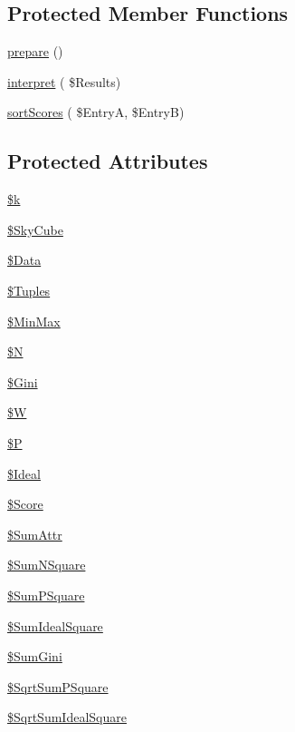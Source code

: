 \subsection*{Protected Member Functions}
\begin{DoxyCompactItemize}
\item 
\hyperlink{class_co_sky_a66c49b4768ec95a9d5b34e3de4a96811}{prepare} ()
\item 
\hyperlink{class_co_sky_a21516052fcf7945de5775fda402af8e3}{interpret} ( \$Results)
\item 
\hyperlink{class_co_sky_a01722e8cf1457051c45d4294b3fe7546}{sort\+Scores} ( \$EntryA, \$EntryB)
\end{DoxyCompactItemize}
\subsection*{Protected Attributes}
\begin{DoxyCompactItemize}
\item 
\hyperlink{class_co_sky_a993ed390eab942ba98bc0e0331c14880}{\$k}
\item 
\hyperlink{class_co_sky_af58fe3522cbbb1f8f8c41eb16b1a3cfa}{\$\+Sky\+Cube}
\item 
\hyperlink{class_co_sky_aa34db25d91fee3db5635a6eaa1588ce0}{\$\+Data}
\item 
\hyperlink{class_co_sky_ab04bfc46a121d156481eba48241a31a5}{\$\+Tuples}
\item 
\hyperlink{class_co_sky_a53133580b9cb17857e284e2a27db03e8}{\$\+Min\+Max}
\item 
\hyperlink{class_co_sky_a3507a44d5f4010a7955810a0e0b34800}{\$N}
\item 
\hyperlink{class_co_sky_a29e482e00d5e8d686a0be25434f46fe8}{\$\+Gini}
\item 
\hyperlink{class_co_sky_af9002652ded47bf3132763967acf8430}{\$W}
\item 
\hyperlink{class_co_sky_afba08e6d5ce3b942050b2f9d5008122b}{\$P}
\item 
\hyperlink{class_co_sky_ace14bb65d6c34bac7eacb57872835844}{\$\+Ideal}
\item 
\hyperlink{class_co_sky_aeb1c9b9c7feccaba43a887fbe45e6900}{\$\+Score}
\item 
\hyperlink{class_co_sky_af3a0434a6bbee5956e088867349a5b2a}{\$\+Sum\+Attr}
\item 
\hyperlink{class_co_sky_a759f0dbbb79ffe1b04c3043ca703a0ef}{\$\+Sum\+N\+Square}
\item 
\hyperlink{class_co_sky_a2028d8b7a23b4b0fa302edb90852622e}{\$\+Sum\+P\+Square}
\item 
\hyperlink{class_co_sky_a34ab466c22a80395619c67d219246a69}{\$\+Sum\+Ideal\+Square}
\item 
\hyperlink{class_co_sky_af57628efadb84a86e6688720871e8472}{\$\+Sum\+Gini}
\item 
\hyperlink{class_co_sky_a1910c1ccd9894d0b5cd55e6299f5cf78}{\$\+Sqrt\+Sum\+P\+Square}
\item 
\hyperlink{class_co_sky_ac6054bc57e6ce848ab218b3cfa0a4a92}{\$\+Sqrt\+Sum\+Ideal\+Square}
\end{DoxyCompactItemize}


